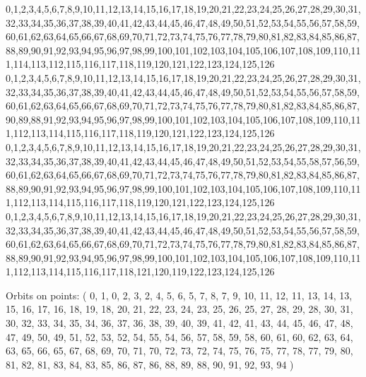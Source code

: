 \documentclass[12pt]{article}
\begin{document}
{0,1,2,3,4,5,6,7,8,9,10,11,12,13,14,15,16,17,18,19,20,21,22,23,24,25,26,27,28,29,30,31,32,33,34,35,36,37,38,39,40,41,42,43,44,45,46,47,48,49,50,51,52,53,54,55,56,57,58,59,60,61,62,63,64,65,66,67,68,69,70,71,72,73,74,75,76,77,78,79,80,81,82,83,84,85,86,87,88,89,90,91,92,93,94,95,96,97,98,99,100,101,102,103,104,105,106,107,108,109,110,111,114,113,112,115,116,117,118,119,120,121,122,123,124,125,126\\
0,1,2,3,4,5,6,7,8,9,10,11,12,13,14,15,16,17,18,19,20,21,22,23,24,25,26,27,28,29,30,31,32,33,34,35,36,37,38,39,40,41,42,43,44,45,46,47,48,49,50,51,52,53,54,55,56,57,58,59,60,61,62,63,64,65,66,67,68,69,70,71,72,73,74,75,76,77,78,79,80,81,82,83,84,85,86,87,90,89,88,91,92,93,94,95,96,97,98,99,100,101,102,103,104,105,106,107,108,109,110,111,112,113,114,115,116,117,118,119,120,121,122,123,124,125,126\\
0,1,2,3,4,5,6,7,8,9,10,11,12,13,14,15,16,17,18,19,20,21,22,23,24,25,26,27,28,29,30,31,32,33,34,35,36,37,38,39,40,41,42,43,44,45,46,47,48,49,50,51,52,53,54,55,58,57,56,59,60,61,62,63,64,65,66,67,68,69,70,71,72,73,74,75,76,77,78,79,80,81,82,83,84,85,86,87,88,89,90,91,92,93,94,95,96,97,98,99,100,101,102,103,104,105,106,107,108,109,110,111,112,113,114,115,116,117,118,119,120,121,122,123,124,125,126\\
0,1,2,3,4,5,6,7,8,9,10,11,12,13,14,15,16,17,18,19,20,21,22,23,24,25,26,27,28,29,30,31,32,33,34,35,36,37,38,39,40,41,42,43,44,45,46,47,48,49,50,51,52,53,54,55,56,57,58,59,60,61,62,63,64,65,66,67,68,69,70,71,72,73,74,75,76,77,78,79,80,81,82,83,84,85,86,87,88,89,90,91,92,93,94,95,96,97,98,99,100,101,102,103,104,105,106,107,108,109,110,111,112,113,114,115,116,117,118,121,120,119,122,123,124,125,126\\

\bigskip

Orbits on points: ( 0, 1, 0, 2, 3, 2, 4, 5, 6, 5, 7, 8, 7, 9, 10, 11, 12, 11, 13, 14, 13, 15, 16, 17, 16, 18, 19, 18, 20, 21, 22, 23, 24, 23, 25, 26, 25, 27, 28, 29, 28, 30, 31, 30, 32, 33, 34, 35, 34, 36, 37, 36, 38, 39, 40, 39, 41, 42, 41, 43, 44, 45, 46, 47, 48, 47, 49, 50, 49, 51, 52, 53, 52, 54, 55, 54, 56, 57, 58, 59, 58, 60, 61, 60, 62, 63, 64, 63, 65, 66, 65, 67, 68, 69, 70, 71, 70, 72, 73, 72, 74, 75, 76, 75, 77, 78, 77, 79, 80, 81, 82, 81, 83, 84, 83, 85, 86, 87, 86, 88, 89, 88, 90, 91, 92, 93, 94 )\\


%


%


}%
\end{document}
